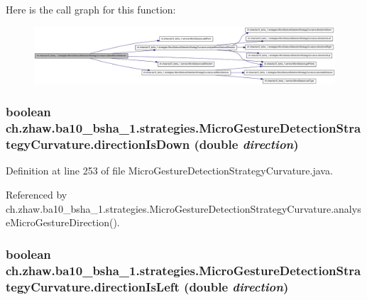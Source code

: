 Here is the call graph for this function:\nopagebreak
\begin{figure}[H]
\begin{center}
\leavevmode
\includegraphics[width=420pt]{classch_1_1zhaw_1_1ba10__bsha__1_1_1strategies_1_1MicroGestureDetectionStrategyCurvature_a939545a8c5597d693f4857a8f6195fc9_cgraph}
\end{center}
\end{figure}
\hypertarget{classch_1_1zhaw_1_1ba10__bsha__1_1_1strategies_1_1MicroGestureDetectionStrategyCurvature_a1c4ae8dcc40fa0809afcbc701a5afa65}{
\subsubsection[{directionIsDown}]{\setlength{\rightskip}{0pt plus 5cm}boolean ch.zhaw.ba10\_\-bsha\_\-1.strategies.MicroGestureDetectionStrategyCurvature.directionIsDown (double {\em direction})}}
\label{classch_1_1zhaw_1_1ba10__bsha__1_1_1strategies_1_1MicroGestureDetectionStrategyCurvature_a1c4ae8dcc40fa0809afcbc701a5afa65}


Definition at line 253 of file MicroGestureDetectionStrategyCurvature.java.

Referenced by ch.zhaw.ba10\_\-bsha\_\-1.strategies.MicroGestureDetectionStrategyCurvature.analyseMicroGestureDirection().\hypertarget{classch_1_1zhaw_1_1ba10__bsha__1_1_1strategies_1_1MicroGestureDetectionStrategyCurvature_aab6c8ffaec46c10a9d15786b95654afd}{
\subsubsection[{directionIsLeft}]{\setlength{\rightskip}{0pt plus 5cm}boolean ch.zhaw.ba10\_\-bsha\_\-1.strategies.MicroGestureDetectionStrategyCurvature.directionIsLeft (double {\em direction})}}
\label{classch_1_1zhaw_1_1ba10__bsha__1_1_1strategies_1_1MicroGestureDetectionStrategyCurvature_aab6c8ffaec46c10a9d15786b95654afd}


